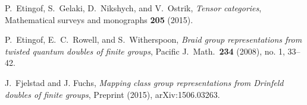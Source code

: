 \documentclass{ws-jktr}
\begin{document}
\begin{thebibliography}{0}

 P.\ Etingof, S.\ Gelaki, D.\ Nikshych,  and V.\ Ostrik, \emph{Tensor categories}, Mathematical surveys and monographs \textbf{205} (2015).

 P.\ Etingof, E.\ C.\ Rowell, and S.\ Witherspoon, \emph{Braid group representations from twisted quantum doubles of finite groups}, Pacific J.\ Math.\ \textbf{234} (2008), no. 1, 33--42.

 J.\ Fjelstad and J. Fuchs, \emph{Mapping class group representations from {Drinfeld} doubles of finite groups}, Preprint (2015), arXiv:1506.03263.










\end{thebibliography}
\end{document}
